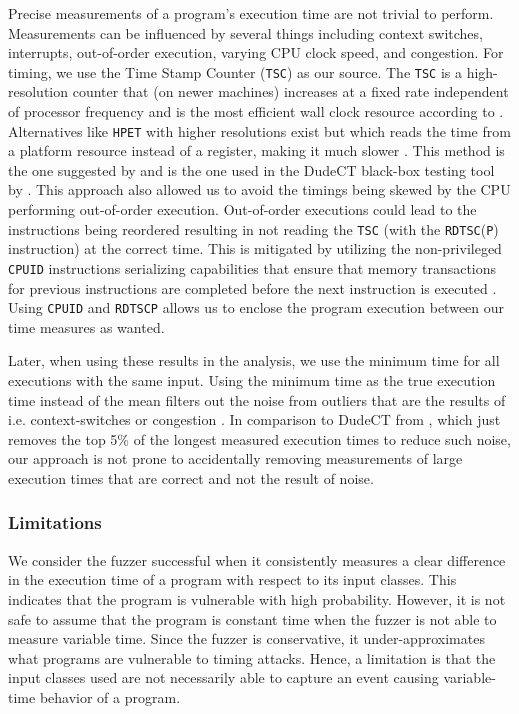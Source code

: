 Precise measurements of a program's execution time are not trivial to perform. 
Measurements can be influenced by several things including context switches, interrupts, out-of-order execution, varying CPU clock speed, and congestion. 
For timing, we use the Time Stamp Counter (\texttt{TSC}) as our source.
The \texttt{TSC} is a high-resolution counter that (on newer machines) increases at a fixed rate independent of processor frequency and is the most efficient wall clock resource according to \citep[b]{intel-reference}.
Alternatives like \texttt{HPET} with higher resolutions exist but which reads the time from a platform resource instead of a register, making it much slower \citep[b]{intel-reference}.
This method is the one suggested by \citep{intel-benchmark-code-execution} and is the one used in the DudeCT black-box testing tool by \citep{dudect}.
This approach also allowed us to avoid the timings being skewed by the CPU performing out-of-order execution.
Out-of-order executions could lead to the instructions being reordered resulting in not reading the \texttt{TSC} (with the \texttt{RDTSC}(\texttt{P}) instruction) at the correct time. 
This is mitigated by utilizing the non-privileged \texttt{CPUID} instructions serializing capabilities that ensure that memory transactions for previous instructions are completed before the next instruction is executed \citep[a]{intel-reference}.
Using \texttt{CPUID} and \texttt{RDTSCP} allows us to enclose the program execution between our time measures as wanted.



Later, when using these results in the analysis, we use the minimum time for all executions with the same input.
Using the minimum time as the true execution time instead of the mean filters out the noise from outliers that are the results of i.e. context-switches or congestion \citep{robust-benchmarking}. 
In comparison to DudeCT from \citep{dudect}, which just removes the top 5\% of the longest measured execution times to reduce such noise, our approach is not prone to accidentally removing measurements of large execution times that are correct and not the result of noise.

\subsubsection{Limitations}
We consider the fuzzer successful when it consistently measures a clear difference in the execution time of a program with respect to its input classes.
This indicates that the program is vulnerable with high probability.
However, it is not safe to assume that the program is constant time when the fuzzer is not able to measure variable time.
Since the fuzzer is conservative, it under-approximates what programs are vulnerable to timing attacks.
Hence, a limitation is that the input classes used are not necessarily able to capture an event causing variable-time behavior of a program.

